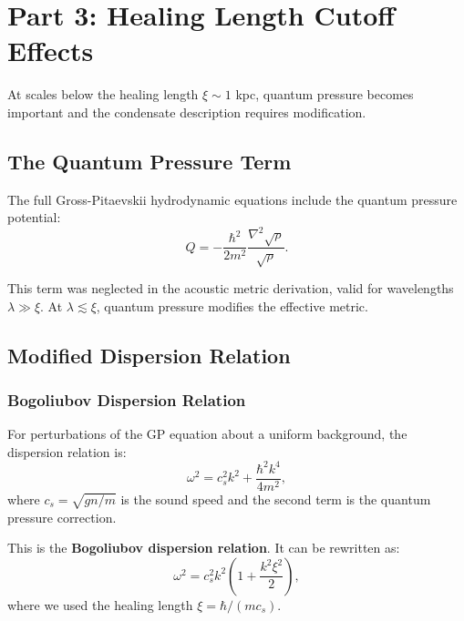 \documentclass[11pt,a4paper]{article}
\theoremstyle{definition}
\theoremstyle{remark}
\begin{document}
\section{Part 3: Healing Length Cutoff Effects}
\label{sec:healing_length}

At scales below the healing length $\xi \sim 1$ kpc, quantum pressure becomes important and the condensate description requires modification.

\subsection{The Quantum Pressure Term}
\label{sec:quantum_pressure}

The full Gross-Pitaevskii hydrodynamic equations include the quantum pressure potential:
\begin{equation}
\label{eq:quantum_potential}
Q = -\frac{\hbar^2}{2m^2} \frac{\nabla^2\sqrt{\rho}}{\sqrt{\rho}}.
\end{equation}

This term was neglected in the acoustic metric derivation, valid for wavelengths $\lambda \gg \xi$. At $\lambda \lesssim \xi$, quantum pressure modifies the effective metric.

\subsection{Modified Dispersion Relation}
\label{sec:dispersion}

\subsubsection{Bogoliubov Dispersion Relation}

For perturbations of the GP equation about a uniform background, the dispersion relation is:
\begin{equation}
\label{eq:bogoliubov}
\omega^2 = c_s^2 k^2 + \frac{\hbar^2 k^4}{4m^2},
\end{equation}
where $c_s = \sqrt{gn/m}$ is the sound speed and the second term is the quantum pressure correction.

This is the \textbf{Bogoliubov dispersion relation}. It can be rewritten as:
\begin{equation}
\label{eq:bogoliubov_xi}
\omega^2 = c_s^2 k^2 \left(1 + \frac{k^2 \xi^2}{2}\right),
\end{equation}
where we used the healing length $\xi = \hbar/(mc_s)$.
\end{document}
